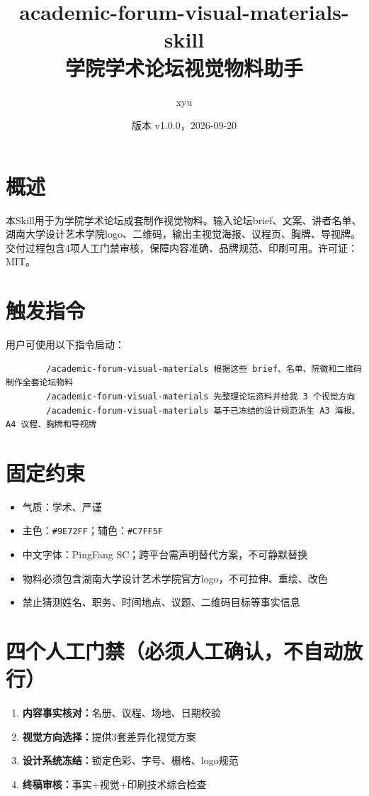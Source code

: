 \documentclass[11pt,a4paper]{article}
\title{academic-forum-visual-materials-skill \\ 学院学术论坛视觉物料助手}
\author{xyu}
\date{版本 v1.0.0，2026-09-20}
\begin{document}
	\maketitle
	
	\section{概述}
	本Skill用于为学院学术论坛成套制作视觉物料。输入论坛brief、文案、讲者名单、湖南大学设计艺术学院logo、二维码，输出主视觉海报、议程页、胸牌、导视牌。
	交付过程包含4项人工门禁审核，保障内容准确、品牌规范、印刷可用。许可证：MIT。
	
	\section{触发指令}
	用户可使用以下指令启动：
	\begin{verbatim}
		/academic-forum-visual-materials 根据这些 brief、名单、院徽和二维码制作全套论坛物料
		/academic-forum-visual-materials 先整理论坛资料并给我 3 个视觉方向
		/academic-forum-visual-materials 基于已冻结的设计规范派生 A3 海报、A4 议程、胸牌和导视牌
	\end{verbatim}
	
	\section{固定约束}
	\begin{itemize}
		\item 气质：学术、严谨
		\item 主色：\texttt{\#9E72FF}；辅色：\texttt{\#C7FF5F}
		\item 中文字体：PingFang SC；跨平台需声明替代方案，不可静默替换
		\item 物料必须包含湖南大学设计艺术学院官方logo，不可拉伸、重绘、改色
		\item 禁止猜测姓名、职务、时间地点、议题、二维码目标等事实信息
	\end{itemize}
	
	\section{四个人工门禁（必须人工确认，不自动放行）}
	\begin{enumerate}
		\item \textbf{内容事实核对：}名册、议程、场地、日期校验
		\item \textbf{视觉方向选择：}提供3套差异化视觉方案
		\item \textbf{设计系统冻结：}锁定色彩、字号、栅格、logo规范
		\item \textbf{终稿审核：}事实+视觉+印刷技术综合检查
	\end{enumerate}
	
\end{document}
